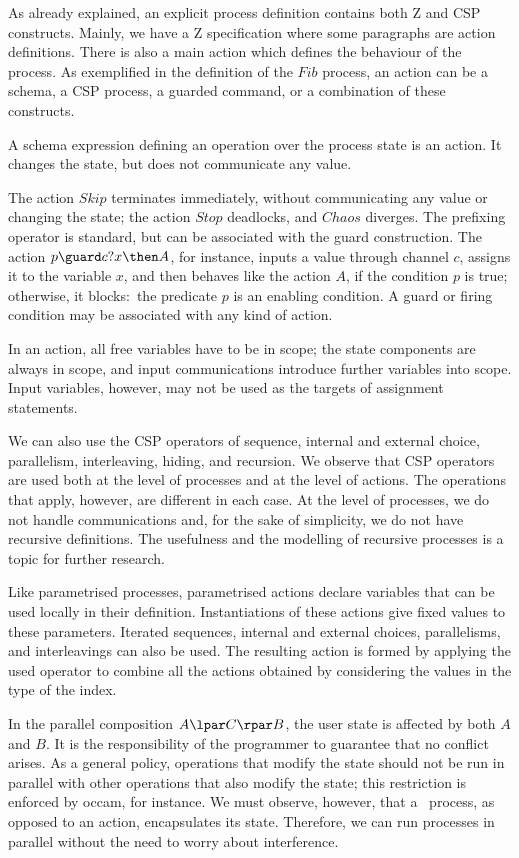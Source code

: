 \documentclass{article}
\begin{document}
As already explained, an explicit process definition contains both Z
and CSP constructs.  Mainly, we have a Z specification where some
paragraphs are action definitions.  There is also a main action which
defines the behaviour of the process.  As exemplified in the
definition of the $Fib$ process, an action can be a schema, a CSP
process, a guarded command, or a combination of these constructs.

A schema expression defining an operation over the process state is an
action.  It changes the state, but does not communicate any value.

The action $Skip$ terminates immediately, without communicating any
value or changing the state; the action $Stop$ deadlocks, and $Chaos$
diverges.  The prefixing operator is standard, but can be associated
with the guard construction.  The action $p \guard c?x \then A$, for
instance, inputs a value through channel $c$, assigns it to the
variable $x$, and then behaves like the action $A$, if the condition
$p$ is true; otherwise, it blocks:~the predicate $p$ is an enabling
condition.  A guard or firing condition may be associated with any
kind of action.

In an action, all free variables have to be in scope; the state
components are always in scope, and input communications introduce
further variables into scope.  Input variables, however, may not be
used as the targets of assignment statements.

We can also use the CSP operators of sequence, internal and external
choice, parallelism, interleaving, hiding, and recursion.  We observe
that CSP operators are used both at the level of processes and at the
level of actions.  The operations that apply, however, are different
in each case.  At the level of processes, we do not handle
communications and, for the sake of simplicity, we do not have
recursive definitions.  The usefulness and the modelling of recursive
processes is a topic for further research.

Like parametrised processes, parametrised actions declare variables
that can be used locally in their definition.  Instantiations of these
actions give fixed values to these parameters.  Iterated sequences,
internal and external choices, parallelisms, and interleavings can
also be used.  The resulting action is formed by applying the used
operator to combine all the actions obtained by considering the values
in the type of the index.

In the parallel composition $A \lpar C \rpar B$, the user state is
affected by both $A$ and $B$.  It is the responsibility of the
programmer to guarantee that no conflict arises.  As a general policy,
operations that modify the state should not be run in parallel with
other operations that also modify the state; this restriction is
enforced by occam, for instance.  We must observe, however, that a
\Circus\ process, as opposed to an action, encapsulates its state.
Therefore, we can run processes in parallel without the need to worry
about interference.
\end{document}
